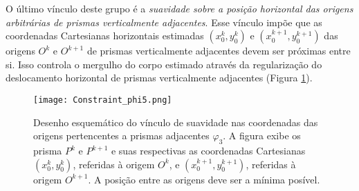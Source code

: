 O último vínculo deste grupo é a \textit{suavidade sobre a posição horizontal das origens arbitrárias de prismas verticalmente adjacentes}. Esse vínculo impõe que as coordenadas Cartesianas horizontais estimadas $(x_{0}^{k}, y_{0}^{k})$ e $(x_{0}^{k+1}, y_{0}^{k+1})$ das origens $O^{k}$ e $O^{k+1}$ 
de prismas verticalmente adjacentes devem ser próximas entre si. Isso controla o mergulho do corpo estimado através da regularização do deslocamento horizontal de prismas verticalmente adjacentes (Figura \ref{fig:phi3}).

\begin{figure}[!htb]
	\centering
	\texttt{[image: Constraint\_phi5.png]}
	\caption{Desenho esquemático do vínculo de suavidade nas coordenadas das origens pertencentes a prismas adjacentes $\varphi_{3}$. A figura exibe os prisma $P^k$ e $P^{k+1}$ e suas respectivas as coordenadas Cartesianas $(x_0^k,y_0^k)$, referidas à origem $O^k$, e $(x_0^{k+1},y_0^{k+1})$, referidas à origem $O^{k+1}$. A posição entre as origens deve ser a mínima posível.}
	\label{fig:phi3}
\end{figure}

